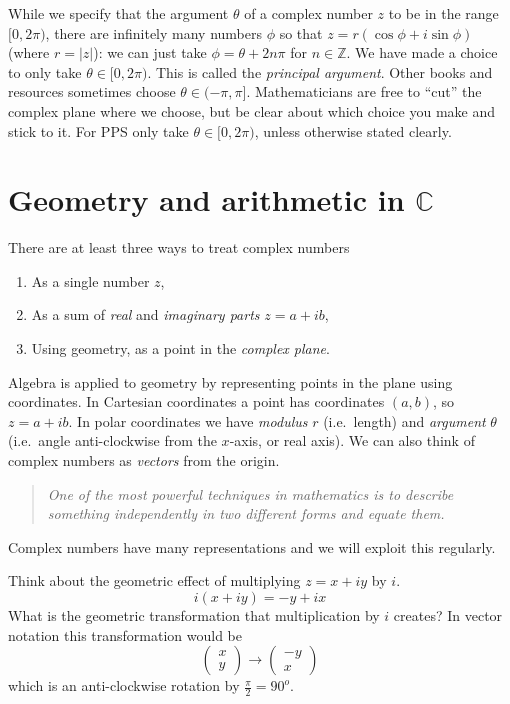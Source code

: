 \documentclass[11pt,dvipsnames]{book}
\numberwithin{equation}{section} %
\numberwithin{figure}{section} %
\numberwithin{table}{section} %
\begin{document}
While we specify that the argument $\theta$ of a complex number $z$ to be in the range $[0,2\pi)$, there are infinitely many numbers $\phi$ so that $z= r(\cos\phi+i\sin\phi)$ (where $r=|z|$): we can just take $\phi = \theta+ 2n\pi$ for $n\in\mathbb{Z}$. 
We have made a choice to only take $\theta\in [0,2\pi)$.  This is called the {\em principal argument}.
Other books and resources sometimes choose $\theta\in (-\pi,\pi]$.
Mathematicians are free to ``cut'' the complex plane where we choose, but be clear about which choice you make and stick to it.
For PPS only take $\theta\in [0,2\pi)$, unless otherwise stated clearly.

\section{Geometry and arithmetic in \(\mathbb{C}\)}

There are at least three ways to treat complex numbers
\begin{enumerate}
  \item As a single number $z$,
  \item As a sum of {\em real} and {\em imaginary parts} $z=a+ib$,
  \item Using geometry, as a point in the {\em complex plane}.
\end{enumerate}
Algebra is applied to geometry by representing points in the plane using coordinates.  
In Cartesian coordinates a point has coordinates $(a,b)$, so \(z=a+ib\). 
In polar coordinates we have {\em modulus} $r$ (i.e.~length) and {\em argument} $\theta$ (i.e.~angle anti-clockwise from the $x$-axis, or real axis). 
We can also think of complex numbers as {\em vectors} from the origin.
\begin{quote}
    {\em One of the most powerful techniques in mathematics is to describe something independently in two different forms and equate them.}
\end{quote}
Complex numbers have many representations and we will exploit this regularly.

Think about the geometric effect of multiplying \(z=x+iy\) by \(i\).
\[ i(x+iy)=-y+ix\]
What is the geometric transformation that multiplication by \(i\) creates?
In vector notation this transformation would be 
\[ \begin{pmatrix} x \\ y \end{pmatrix} \rightarrow \begin{pmatrix} -y \\ x \end{pmatrix}\]
which is an anti-clockwise rotation by \(\frac{\pi}{2}=90^o\).
\end{document}
